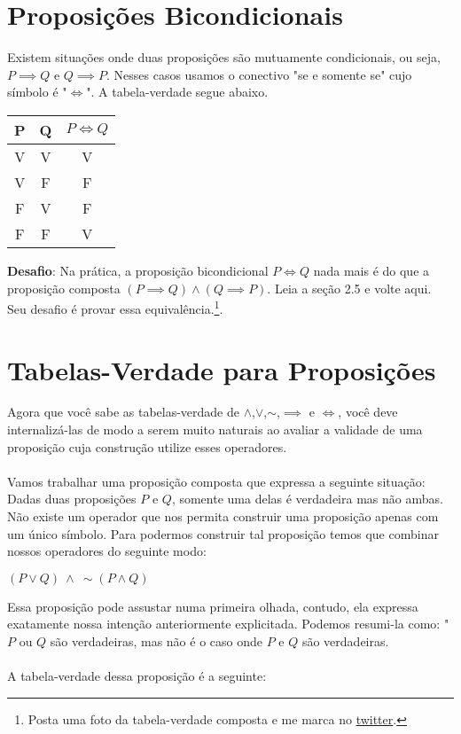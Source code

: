\documentclass[a4paper,11pt]{book}
\theoremstyle{definition}
\begin{document}
\section{Proposições Bicondicionais}

Existem situações onde duas proposições são mutuamente condicionais, ou seja, $P \implies Q$ e $Q \implies P$. Nesses casos usamos o conectivo "se e somente se" cujo símbolo é "$\iff$".  A tabela-verdade segue abaixo.

\begin{center}
\begin{tabular}{ c c || c }
 P & Q & $P \iff Q$ \\ 
 \hline
 V & V & V \\  
 V & F & F \\  
 F & V & F \\  
 F & F & V
\end{tabular}
\end{center}

\textbf{Desafio}: Na prática, a proposição bicondicional $P \iff Q$ nada mais é do que a proposição composta $(P \implies Q) \land (Q \implies P)$. Leia a seção 2.5 e volte aqui. Seu desafio é provar essa equivalência.\footnote{Posta uma foto da tabela-verdade composta e me marca no  \href{https://twitter.com/bruno_ruas2}{twitter}.}.


\section{Tabelas-Verdade para Proposições}

Agora que você sabe as tabelas-verdade de $\land$,$\lor$,$\sim$,$\implies$ e $\iff$, você deve internalizá-las de modo a serem muito naturais ao avaliar a validade de uma proposição cuja construção utilize esses operadores.
\\
\\
Vamos trabalhar uma proposição composta que expressa a seguinte situação: Dadas duas proposições $P$ e $Q$, somente uma delas é verdadeira mas não ambas. Não existe um operador que nos permita construir uma proposição apenas com um único símbolo. Para podermos construir tal proposição temos que combinar nossos operadores do seguinte modo:

\begin{center}
	$(P \lor Q) \ \land \ \sim (P \land Q)$
\end{center}

Essa proposição pode assustar numa primeira olhada, contudo, ela expressa exatamente nossa intenção anteriormente explicitada. Podemos resumi-la como: "$P$ ou $Q$ são verdadeiras, mas não é o caso onde $P$ e $Q$ são verdadeiras.
\\
\\
A tabela-verdade dessa proposição é a seguinte:
\end{document}
